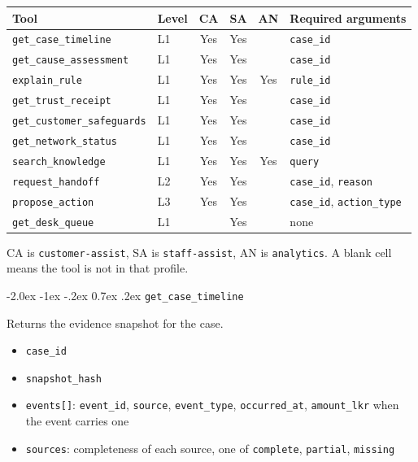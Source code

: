 \documentclass[11pt,a4paper]{article}
\makeatletter
\renewcommand\subsection{%
  \@startsection{subsection}{2}{\z@}%
    {-2.0ex \@plus -1ex \@minus -.2ex}%
    {0.7ex \@plus .2ex}%
    {\large\sffamily\bfseries\color{hcInk}}%
}
\newcommand{\tool}[1]{\texttt{#1}}
\newcommand{\code}[1]{\texttt{#1}}
\makeatother
\begin{document}
\begin{center}
\footnotesize
\setlength{\tabcolsep}{3.5pt}
\begin{tabularx}{\textwidth}{@{}l l c c c X@{}}
\toprule
\textbf{Tool} & \textbf{Level} & \textbf{CA} & \textbf{SA} & \textbf{AN} & \textbf{Required arguments} \\
\midrule
\tool{get\_case\_timeline} & L1 & Yes & Yes &  & \code{case\_id} \\
\tool{get\_cause\_assessment} & L1 & Yes & Yes &  & \code{case\_id} \\
\tool{explain\_rule} & L1 & Yes & Yes & Yes & \code{rule\_id} \\
\tool{get\_trust\_receipt} & L1 & Yes & Yes &  & \code{case\_id} \\
\tool{get\_customer\_safeguards} & L1 & Yes & Yes &  & \code{case\_id} \\
\tool{get\_network\_status} & L1 & Yes & Yes &  & \code{case\_id} \\
\tool{search\_knowledge} & L1 & Yes & Yes & Yes & \code{query} \\
\tool{request\_handoff} & L2 & Yes & Yes &  & \code{case\_id}, \code{reason} \\
\tool{propose\_action} & L3 & Yes & Yes &  & \code{case\_id}, \code{action\_type} \\
\tool{get\_desk\_queue} & L1 &  & Yes &  & none \\
\bottomrule
\end{tabularx}
\end{center}

\noindent CA is \code{customer-assist}, SA is \code{staff-assist}, AN is \code{analytics}. A blank cell means the tool is not in that profile.

\subsection{\tool{get\_case\_timeline}}

Returns the evidence snapshot for the case.

\begin{itemize}
  \item \code{case\_id}
  \item \code{snapshot\_hash}
  \item \code{events[]}: \code{event\_id}, \code{source}, \code{event\_type}, \code{occurred\_at}, \code{amount\_lkr} when the event carries one
  \item \code{sources}: completeness of each source, one of \code{complete}, \code{partial}, \code{missing}
\end{itemize}
\end{document}
